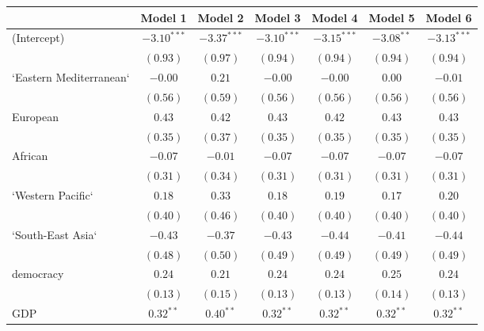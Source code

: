 
\begin{table}[!h]
\begin{center}
\begin{tabular}{l c c c c c c }
\toprule
 & Model 1 & Model 2 & Model 3 & Model 4 & Model 5 & Model 6 \\
\midrule
(Intercept)             & $-3.10^{***}$ & $-3.37^{***}$ & $-3.10^{***}$ & $-3.15^{***}$ & $-3.08^{**}$ & $-3.13^{***}$ \\
                        & $(0.93)$      & $(0.97)$      & $(0.94)$      & $(0.94)$      & $(0.94)$     & $(0.94)$      \\
`Eastern Mediterranean` & $-0.00$       & $0.21$        & $-0.00$       & $-0.00$       & $0.00$       & $-0.01$       \\
                        & $(0.56)$      & $(0.59)$      & $(0.56)$      & $(0.56)$      & $(0.56)$     & $(0.56)$      \\
European                & $0.43$        & $0.42$        & $0.43$        & $0.42$        & $0.43$       & $0.43$        \\
                        & $(0.35)$      & $(0.37)$      & $(0.35)$      & $(0.35)$      & $(0.35)$     & $(0.35)$      \\
African                 & $-0.07$       & $-0.01$       & $-0.07$       & $-0.07$       & $-0.07$      & $-0.07$       \\
                        & $(0.31)$      & $(0.34)$      & $(0.31)$      & $(0.31)$      & $(0.31)$     & $(0.31)$      \\
`Western Pacific`       & $0.18$        & $0.33$        & $0.18$        & $0.19$        & $0.17$       & $0.20$        \\
                        & $(0.40)$      & $(0.46)$      & $(0.40)$      & $(0.40)$      & $(0.40)$     & $(0.40)$      \\
`South-East Asia`       & $-0.43$       & $-0.37$       & $-0.43$       & $-0.44$       & $-0.41$      & $-0.44$       \\
                        & $(0.48)$      & $(0.50)$      & $(0.49)$      & $(0.49)$      & $(0.49)$     & $(0.49)$      \\
democracy               & $0.24$        & $0.21$        & $0.24$        & $0.24$        & $0.25$       & $0.24$        \\
                        & $(0.13)$      & $(0.15)$      & $(0.13)$      & $(0.13)$      & $(0.14)$     & $(0.13)$      \\
GDP                     & $0.32^{**}$   & $0.40^{**}$   & $0.32^{**}$   & $0.32^{**}$   & $0.32^{**}$  & $0.32^{**}$   \\

\end{tabular}
\end{center}
\end{table}
